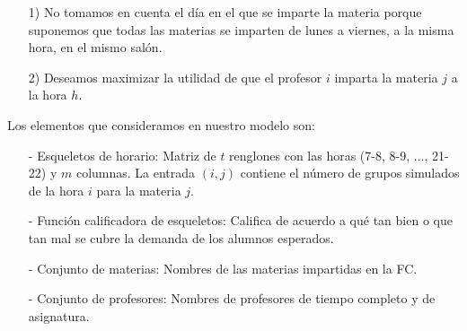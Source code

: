 \begin{enumerate}
\item[1)] No tomamos en cuenta el día en el que se imparte la materia porque suponemos que todas las materias se imparten de lunes a viernes, a la misma hora, en el mismo salón.

\item[2)] Deseamos maximizar la utilidad de que el profesor $i$ imparta la materia $j$ a la hora $h$.
\end{enumerate}

  
  Los elementos que consideramos en nuestro modelo son:
  
  \begin{itemize}
\item[-] Esqueletos de horario: Matriz de $t$ renglones con las horas (7-8, 8-9, $\ldots$, 21-22) y $m$ columnas. La entrada $(i,j)$ contiene el número de grupos simulados de la hora $i$ para la materia $j$.

\item[-] Función calificadora de esqueletos: Califica de acuerdo a qué tan bien o que tan mal se cubre la demanda de los alumnos esperados.

\item[-] Conjunto de materias: Nombres de las materias impartidas en la FC.

\item[-] Conjunto de profesores: Nombres de profesores de tiempo completo y de asignatura.
\end{itemize}


